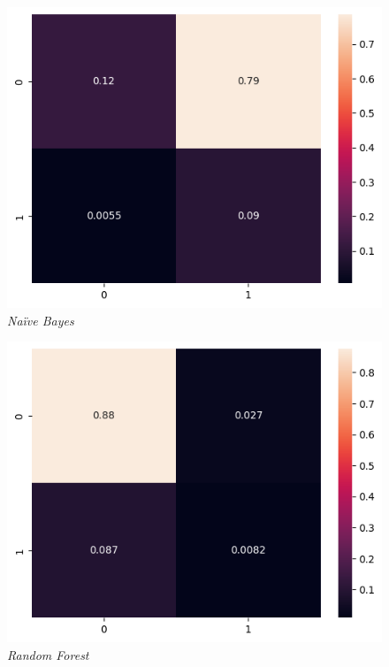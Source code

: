 \documentclass[12pt, a4paper]{article}
\begin{document}
    	\begin{figure}[H]
    		\centering
    		\begin{minipage}[b]{0.46\textwidth}    				
        		\centering
        		\includegraphics[width=\textwidth]{complete_nb_confusion_matrix.png}
        		\textit{\small Na\"ive Bayes}
    		\end{minipage}
    		\hfill
    		\begin{minipage}[b]{0.46\textwidth}
        		\centering
        		\includegraphics[width=\textwidth]{complete_rf_confusion_matrix.png}
        		\textit{\small Random Forest}
    		\end{minipage}

\end{figure}
\end{document}
